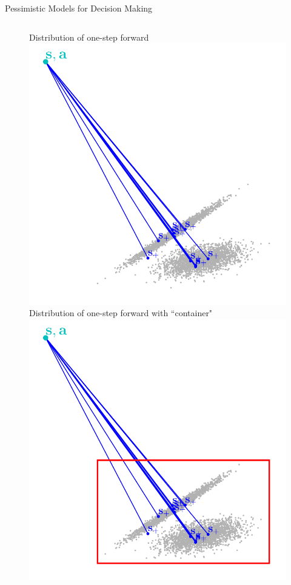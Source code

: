 \documentclass[lecture]{beamer}
\begin{document}
\begin{frame}{\normalsize Pessimistic Models for Decision Making}
\begin{columns}[t]
\vspace{-1cm}
  \begin{overlayarea}{\textwidth}{0.6\textheight}
    \begin{figure}
     \newcommand{\FS}{1}
        {
        \center
        Distribution of one-step forward
	\includegraphics[width=1\textwidth,clip]{Codes/BasicsSafety/PessimisticOneStep0.pdf}
	}
        {
        \center
        Distribution of one-step forward with ``container"
	\includegraphics[width=1\textwidth,clip]{Codes/BasicsSafety/PessimisticOneStep1.pdf}
}
\end{figure}
\end{overlayarea}
\end{columns}
\end{frame}
\end{document}
